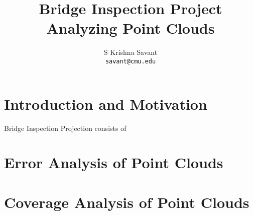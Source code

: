 \documentclass[notitlepage]{article}
\title{Bridge Inspection Project\\[1cm]\textbf{Analyzing Point Clouds}\\[1cm]}
\author{S Krishna Savant\\
        \texttt{savant@cmu.edu}\\
        }
\begin{document}
\maketitle

\tableofcontents

\pagebreak

\section{Introduction and Motivation}
        Bridge Inspection Projection consists of 

\section{Error Analysis of Point Clouds}


\section{Coverage Analysis of Point Clouds}
\end{document}
